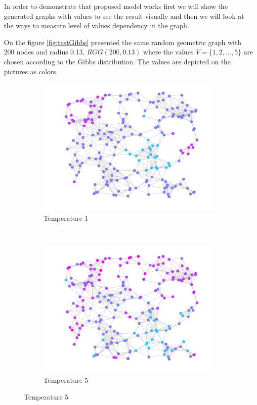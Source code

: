 \documentclass[12pt]{report}
\begin{document}
In order to demonstrate that proposed model works first we will show the generated graphs with values to see the result visually and then we will look at the ways to measure level of values dependency in the graph.

On the figure \ref{fig:testGibbs} presented the same random geometric graph with 200 nodes and radius 0.13, $RGG(200, 0.13)$ where the values $V = \lbrace 1, 2, ..., 5 \rbrace$ are chosen according to the Gibbs distribution. The values are depicted on the pictures as colors.


\begin{figure}[t]
    \centering
    \begin{subfigure}[b]{0.4\textwidth}
        \includegraphics[width=\textwidth]{rggT1}
        \caption{Temperature 1}

    \end{subfigure}
	~ 
    \begin{subfigure}[b]{0.4\textwidth}
        \includegraphics[width=\textwidth]{rggT5}
        \caption{Temperature 5}


\end{subfigure}
\end{figure}
\end{document}

